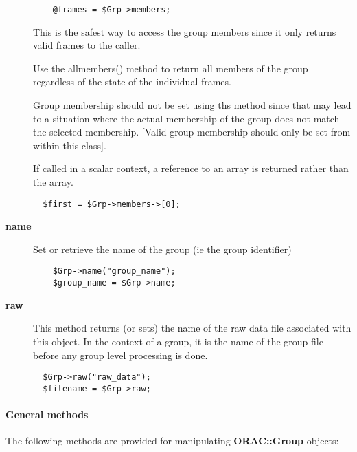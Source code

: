 \begin{description}
\begin{verbatim}
    @frames = $Grp->members;
\end{verbatim}


This is the safest way to access the group members
since it only returns valid frames to the caller.



Use the allmembers() method to return all members of the group 
regardless of the state of the individual frames.



Group membership should not be set using ths method since that may lead
to a situation where the actual membership of the group does not match the
selected membership. [Valid group membership should only be set from
within this class].



If called in a scalar context, a reference to an array is returned
rather than the array.

\begin{verbatim}
  $first = $Grp->members->[0];
\end{verbatim}

\item[\textbf{name}] \mbox{}

Set or retrieve the name of the group (ie the 
group identifier)

\begin{verbatim}
    $Grp->name("group_name");
    $group_name = $Grp->name;
\end{verbatim}

\item[\textbf{raw}] \mbox{}

This method returns (or sets) the name of the raw data file
associated with this object. In the context of a group, it is
the name of the group file before any group level processing is
done.

\begin{verbatim}
  $Grp->raw("raw_data");
  $filename = $Grp->raw;
\end{verbatim}
\end{description}
\paragraph*{General methods\label{ORAC::Group_General_methods}}


The following methods are provided for manipulating \textbf{ORAC::Group}
objects:

